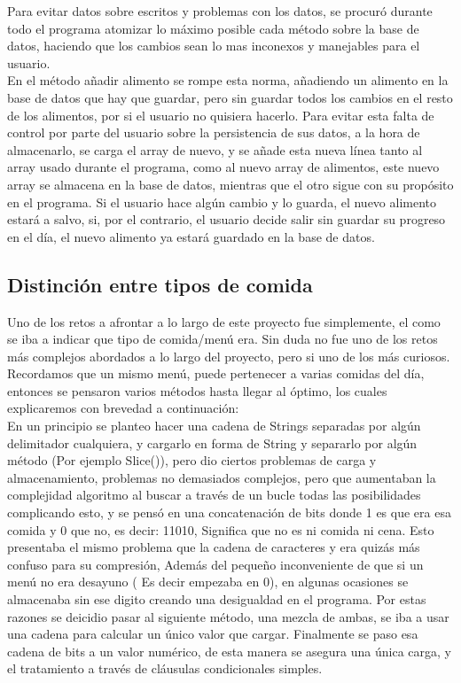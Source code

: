 Para evitar datos sobre escritos y problemas con los datos, se procuró durante todo el programa atomizar lo máximo posible cada método sobre la base de datos, haciendo que los cambios sean lo mas inconexos y manejables para el usuario. \\

En el método añadir alimento se rompe esta norma, añadiendo un alimento en la base de datos que hay que guardar, pero sin guardar todos los cambios en el resto de los alimentos, por si el usuario no quisiera hacerlo. Para evitar esta falta de control por parte del usuario sobre la persistencia de sus datos, a la hora de almacenarlo, se carga el array de nuevo, y se añade esta nueva línea tanto al array usado durante el programa, como al nuevo array de alimentos, este nuevo array se almacena en la base de datos, mientras que el otro sigue con su propósito en el programa. Si el usuario hace algún cambio y lo guarda, el nuevo alimento estará a salvo, si, por el contrario, el usuario decide salir sin guardar su progreso en el día, el nuevo alimento ya estará guardado en la base de datos.\\
\subsection{Distinción entre tipos de comida}
Uno de los retos a afrontar a lo largo de este proyecto fue simplemente, el como se iba a indicar que tipo de comida/menú era. Sin duda no fue uno de los retos más complejos abordados a lo largo del proyecto, pero si uno de los más curiosos.\\

Recordamos que un mismo menú, puede pertenecer a varias comidas del día, entonces se pensaron varios métodos hasta llegar al óptimo, los cuales explicaremos con brevedad a continuación:\\

En un principio se planteo hacer una cadena de Strings separadas por algún delimitador cualquiera, y cargarlo en forma de String y separarlo por algún método (Por ejemplo Slice()), pero dio ciertos problemas de carga y almacenamiento, problemas no demasiados complejos, pero que aumentaban la complejidad algoritmo al buscar a través de un bucle todas las posibilidades complicando esto, y se pensó en una concatenación de bits donde 1 es que era esa comida y 0 que no, es decir: 11010, Significa que no es ni comida ni cena. Esto presentaba el mismo problema que la cadena de caracteres y era quizás más confuso para su compresión, Además del pequeño inconveniente de que si un menú no era desayuno ( Es decir empezaba en 0), en algunas ocasiones se almacenaba sin ese digito creando una desigualdad en el programa. Por estas razones se deicidio pasar al siguiente método, una mezcla de ambas, se iba a usar una cadena para calcular un único valor que cargar. Finalmente se paso esa cadena de bits a un valor numérico, de esta manera se asegura una única carga, y el tratamiento a través de cláusulas condicionales simples.\\

